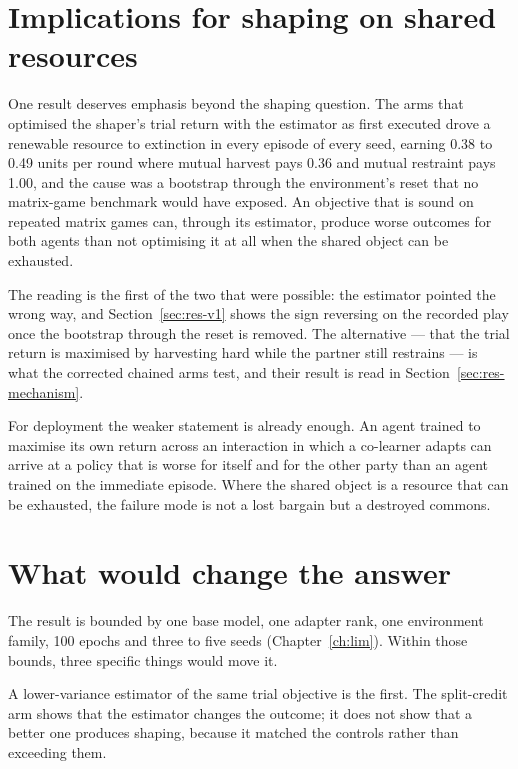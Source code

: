\section{Implications for shaping on shared resources}
\label{sec:disc-commons}

One result deserves emphasis beyond the shaping question.
The arms that optimised the shaper's trial return with the estimator as
first executed drove a renewable resource to extinction in every episode of
every seed, earning 0.38 to 0.49 units per round where mutual harvest pays
0.36 and mutual restraint pays 1.00, and the cause was a bootstrap through
the environment's reset that no matrix-game benchmark would have exposed.
An objective that is sound on repeated matrix games can, through its
estimator, produce worse outcomes for both agents than not optimising it
at all when the shared object can be exhausted.

The reading is the first of the two that were possible: the estimator
pointed the wrong way, and Section~\ref{sec:res-v1} shows the sign
reversing on the recorded play once the bootstrap through the reset is
removed.
The alternative --- that the trial return is maximised by harvesting hard
while the partner still restrains --- is what the corrected chained arms
test, and their result is read in Section~\ref{sec:res-mechanism}.

For deployment the weaker statement is already enough.
An agent trained to maximise its own return across an interaction in which a
co-learner adapts can arrive at a policy that is worse for itself and for
the other party than an agent trained on the immediate episode.
Where the shared object is a resource that can be exhausted, the failure
mode is not a lost bargain but a destroyed commons.

\section{What would change the answer}
\label{sec:disc-next}

The result is bounded by one base model, one adapter rank, one environment
family, 100 epochs and three to five seeds (Chapter~\ref{ch:lim}).
Within those bounds, three specific things would move it.

A lower-variance estimator of the same trial objective is the first.
The split-credit arm shows that the estimator changes the outcome; it does
not show that a better one produces shaping, because it matched the controls
rather than exceeding them.

